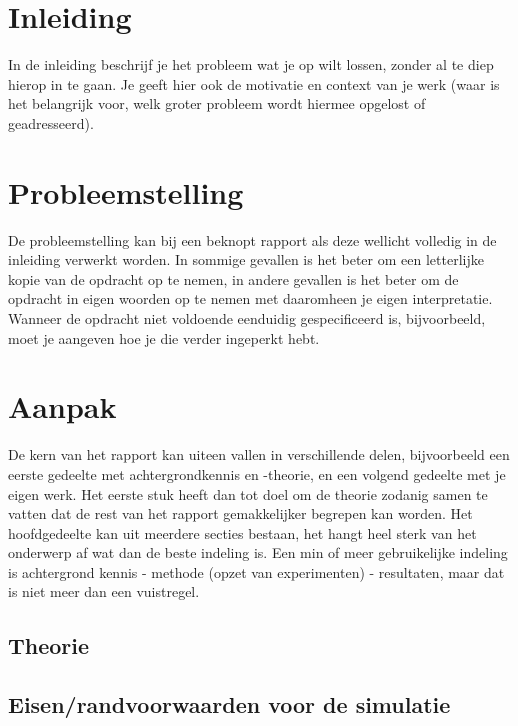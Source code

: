 \documentclass{report}
\begin{document}
\newcommand{\rp}{$\rightarrow$}
\newcommand{\Ohm}{$\Omega$}
\newcommand{\ohm}{$\omega$}
\newcommand{\gmu}{$\mu$}
\newcommand{\tss}{\textsubscript}
\newcommand{\lijst}{}



\chapter{Inleiding}
In de inleiding beschrijf je het probleem wat je op wilt lossen, zonder al te diep hierop in te gaan. Je
geeft hier ook de motivatie en context van je werk (waar is het belangrijk voor, welk groter probleem
wordt hiermee opgelost of geadresseerd).

\chapter{Probleemstelling}
De probleemstelling kan bij een beknopt rapport als deze wellicht volledig in de inleiding verwerkt
worden. In sommige gevallen is het beter om een letterlijke kopie van de opdracht op te nemen, in
andere gevallen is het beter om de opdracht in eigen woorden op te nemen met daaromheen je eigen
interpretatie. Wanneer de opdracht niet voldoende eenduidig gespeciﬁceerd is, bijvoorbeeld, moet je
aangeven hoe je die verder ingeperkt hebt.

\chapter{Aanpak}
De kern van het rapport kan uiteen vallen in verschillende delen, bijvoorbeeld een eerste gedeelte
met achtergrondkennis en -theorie, en een volgend gedeelte met je eigen werk. Het eerste stuk
heeft dan tot doel om de theorie zodanig samen te vatten dat de rest van het rapport gemakkelijker
begrepen kan worden. Het hoofdgedeelte kan uit meerdere secties bestaan, het hangt heel sterk van
het onderwerp af wat dan de beste indeling is. Een min of meer gebruikelijke indeling is achtergrond
kennis - methode (opzet van experimenten) - resultaten, maar dat is niet meer dan een vuistregel.



\section{Theorie}
\section{Eisen/randvoorwaarden voor de simulatie}
\end{document}
